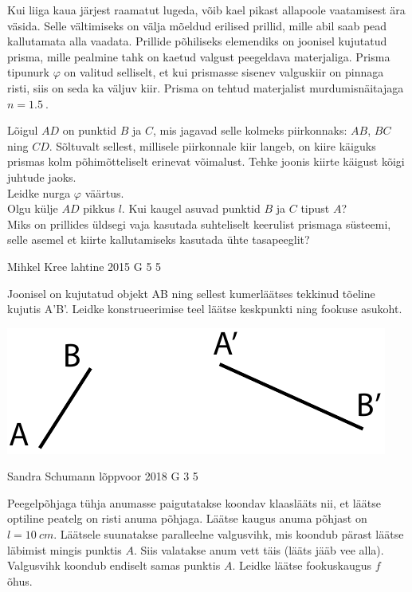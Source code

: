\documentclass[11pt]{article}
\begin{document}
{{Kui liiga kaua järjest raamatut lugeda, võib kael pikast allapoole vaatamisest ära väsida. Selle vältimiseks on välja mõeldud erilised prillid, mille abil saab pead kallutamata alla vaadata. Prillide põhiliseks elemendiks on joonisel kujutatud prisma, mille pealmine tahk on kaetud valgust peegeldava materjaliga. Prisma tipunurk $\varphi$ on valitud selliselt, et kui prismasse sisenev valguskiir on pinnaga risti, siis on seda ka väljuv kiir. Prisma on tehtud materjalist murdumisnäitajaga $n=\SI{1,5}{}$. 

\osa Lõigul $AD$ on punktid $B$ ja $C$, mis jagavad selle kolmeks piirkonnaks: $AB$, $BC$ ning $CD$. Sõltuvalt sellest, millisele piirkonnale kiir langeb, on kiire käiguks prismas kolm põhimõtteliselt erinevat võimalust. Tehke joonis kiirte käigust kõigi juhtude jaoks.\\
\osa Leidke nurga $\varphi$ väärtus.\\
\osa Olgu külje $AD$ pikkus $l$. Kui kaugel asuvad punktid $B$ ja $C$ tipust $A$?\\
\osa Miks on prillides üldsegi vaja kasutada suhteliselt keerulist prismaga süsteemi, selle asemel et kiirte kallutamiseks kasutada ühte tasapeeglit?
\fi
}

{Mihkel Kree} %
{lahtine} %
{2015} %
{G 5} %
{5} %
{
\ifStatement
Joonisel on kujutatud objekt AB ning sellest kumerläätses tekkinud tõeline kujutis A'B'. Leidke konstrueerimise teel läätse keskpunkti ning fookuse asukoht.

\begin{center}
 \includegraphics[width=0.7\linewidth]{2015-lahg-05-laatsMihkel.pdf}
\end{center}
\fi
}

{Sandra Schumann} %
{lõppvoor} %
{2018} %
{G 3} %
{5} %
{
\ifStatement
Peegelpõhjaga tühja anumasse paigutatakse koondav klaaslääts nii, et läätse optiline peatelg on risti anuma põhjaga. Läätse kaugus anuma põhjast on $l=\SI{10}{cm}$. Läätsele suunatakse paralleelne valgusvihk, mis koondub pärast läätse läbimist mingis punktis $A$. Siis valatakse anum vett täis (lääts jääb vee alla). Valgusvihk koondub endiselt samas punktis $A$. Leidke läätse fookuskaugus $f$ õhus.

}}
\end{document}
